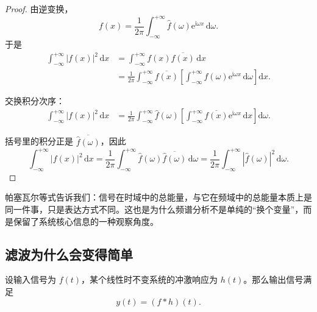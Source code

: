 \begin{proof}
由逆变换，
\begin{equation}
    f(x)=\frac{1}{2\pi}\int_{-\infty}^{+\infty}\hat{f}(\omega)\mathrm{e}^{\mathrm{i}\omega x}\,\mathrm{d}\omega.
\end{equation}
于是
\begin{align}
    \int_{-\infty}^{+\infty}|f(x)|^2\,\mathrm{d}x
    &=
    \int_{-\infty}^{+\infty}
    f(x)\overline{f(x)}\,\mathrm{d}x \\
    &=
    \frac{1}{2\pi}
    \int_{-\infty}^{+\infty}
    \overline{f(x)}
    \left[
        \int_{-\infty}^{+\infty}
        \hat{f}(\omega)\mathrm{e}^{\mathrm{i}\omega x}\,\mathrm{d}\omega
    \right]
    \mathrm{d}x.
\end{align}

交换积分次序：
\begin{align}
    \int_{-\infty}^{+\infty}|f(x)|^2\,\mathrm{d}x
    &=
    \frac{1}{2\pi}
    \int_{-\infty}^{+\infty}
    \hat{f}(\omega)
    \left[
        \int_{-\infty}^{+\infty}
        \overline{f(x)}\mathrm{e}^{\mathrm{i}\omega x}\,\mathrm{d}x
    \right]
    \mathrm{d}\omega.
\end{align}

括号里的积分正是 $\overline{\hat{f}(\omega)}$，因此
\begin{equation}
    \int_{-\infty}^{+\infty}|f(x)|^2\,\mathrm{d}x
    =
    \frac{1}{2\pi}
    \int_{-\infty}^{+\infty}
    \hat{f}(\omega)\overline{\hat{f}(\omega)}\,\mathrm{d}\omega
    =
    \frac{1}{2\pi}
    \int_{-\infty}^{+\infty}|\hat{f}(\omega)|^2\,\mathrm{d}\omega.
\end{equation}
\end{proof}

\begin{wulibj}[物理意义]
帕塞瓦尔等式告诉我们：信号在时域中的总能量，与它在频域中的总能量本质上是同一件事，只是表达方式不同。这也是为什么频谱分析不是单纯的``换个变量''，而是保留了系统核心信息的一种观察角度。
\end{wulibj}

\subsection{滤波为什么会变得简单}

设输入信号为 $f(t)$，某个线性时不变系统的冲激响应为 $h(t)$。那么输出信号满足
\begin{equation}
    y(t)=(f*h)(t).
\end{equation}

